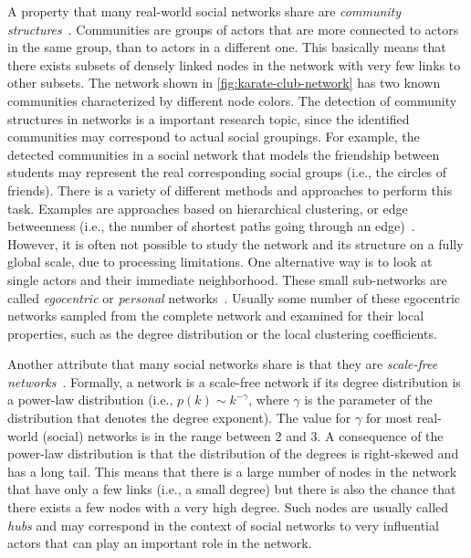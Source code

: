 A property that many real-world social networks share are \emph{community structures}~\cite{Girvan2002}.
Communities are groups of actors that are more connected to actors in the same group, than to actors in a different one.
This basically means that there exists subsets of densely linked nodes in the network with very few links to other subsets.
The network shown in \cref{fig:karate-club-network} has two known communities characterized by different node colors.
The detection of community structures in networks is a important research topic, since the identified communities may correspond to actual social groupings.
For example, the detected communities in a social network that models the friendship between students may represent the real corresponding social groups (i.e., the circles of friends).
There is a variety of different methods and approaches to perform this task.
Examples are approaches based on hierarchical clustering, or edge betweenness (i.e., the number of shortest paths going through an edge)~\cite{Fortunato2010}.
However, it is often not possible to study the network and its structure on a fully global scale, due to processing limitations.
One alternative way is to look at single actors and their immediate neighborhood.
These small sub-networks are called \emph{egocentric} or \emph{personal} networks~\cite{Newman2010}.
Usually some number of these egocentric networks sampled from the complete network and examined for their local properties, such as the degree distribution or the local clustering coefficients.

Another attribute that many social networks share is that they are \emph{scale-free networks}~\cite{Barabasi2016}.
Formally, a network is a scale-free network if its degree distribution is a power-law distribution (i.e., \(p(k) \sim k^{-\gamma}\), where \(\gamma\) is the parameter of the distribution that denotes the degree exponent).
The value for \(\gamma\) for most real-world (social) networks is in the range between 2 and 3.
A consequence of the power-law distribution is that the distribution of the degrees is right-skewed and has a long tail.
This means that there is a large number of nodes in the network that have only a few links (i.e., a small degree) but there is also the chance that there exists a few nodes with a very high degree.
Such nodes are usually called \emph{hubs} and may correspond in the context of social networks to very influential actors that can play an important role in the network.

